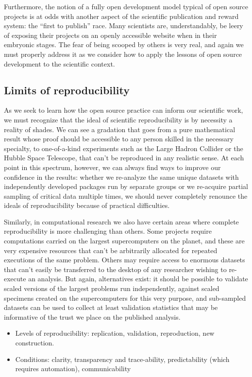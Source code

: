 \documentclass[ChapterTOCs,krantz2]{krantz} %
\begin{document}
Furthermore, the notion of a fully open development model typical
of open source projects is at odds with another aspect of the
scientific publication and reward system: the ``first
to publish'' race. Many scientists are, understandably,
be leery of exposing their projects on an openly accessible website
when in their embryonic stages. The fear of being scooped by others
is very real, and again we must properly address it as we consider
how to apply the lessons of open source development to the scientific
context.


\subsection{Limits of reproducibility}

As we seek to learn how the open source practice can inform our scientific
work, we must recognize that the ideal of scientific reproducibility
is by necessity a reality of shades. We can see a gradation that goes
from a pure mathematical result whose proof should be accessible to
any person skilled in the necessary specialty, to one-of-a-kind experiments
such as the Large Hadron Collider or the Hubble Space Telescope, that
can't be reproduced in any realistic sense. At each point in this
spectrum, however, we can always find ways to improve our confidence
in the results: whether we re-analyze the same unique datasets with
independently developed packages run by separate groups or we re-acquire
partial sampling of critical data multiple times, we should never
completely renounce the ideals of reproducibility because of practical
difficulties.

Similarly, in computational research we also have certain areas where
complete reproducibility is more challenging than others. Some projects
require computations carried on the largest supercomputers on the
planet, and these are very expensive resources that can't be arbitrarily
allocated for repeated executions of the same problem. Others may
require access to enormous datasets that can't easily be transferred
to the desktop of any researcher wishing to re-execute an analysis.
But again, alternatives exist: it should be possible to validate scaled
versions of the largest problems run independently, against scaled
specimens created on the supercomputers for this very purpose, and
sub-sampled datasets can be used to collect at least validation statistics
that may be informative of the trust we place on the published analysis.

\begin{itemize}
\item Levels of reproducibility: replication, validation, reproduction,
new construction.
\item Conditions: clarity, transparency and trace-ability, predictability
(which requires automation), communicability
\end{itemize}
\end{document}
